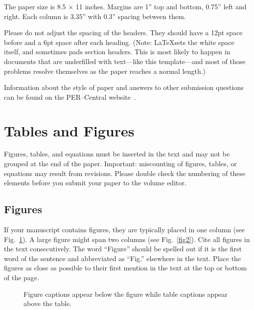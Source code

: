 \documentclass[english,aps,pra,reprint,noshowpacs,superscriptaddress]{revtex4-1}
\begin{document}
The paper size is 8.5 $\times$ 11 inches.  Margins are 1'' top and bottom, 0.75'' left and right.  Each column is 3.35'' with 0.3'' spacing between them.  

Please do not adjust the spacing of the headers.  They should have a 12pt space before and a 6pt space after each heading. (Note: \LaTeX sets the white space itself, and sometimes pads section headers. This is most likely to happen in documents that are underfilled with text---like this template---and most of those problems resolve themselves as the paper reaches a normal length.)

Information about the style of paper and answers to other submission questions can be found on the PER--Central website~\cite{per-cent}. %


\section{Tables and Figures}

Figures, tables, and equations must be inserted in the text and may not be grouped at the end of the paper. Important: miscounting of figures, tables, or equations may result from revisions. Please double check the numbering of these elements before you submit your paper to the volume editor.  %

\subsection{Figures}

If your manuscript contains figures, they are typically placed in one column (see Fig.\ \ref{fig1}).  A large figure might span two columns (see Fig.\ \ref{fig2}).  Cite all figures in the text consecutively. The word ``Figure'' should be spelled out if it is the first word of the sentence and abbreviated as ``Fig.'' elsewhere in the text. Place the figures as close as possible to their first mention in the text at the top or bottom of the page.

\begin{figure}
\caption{Figure captions appear below the figure while table captions appear above the table.\label{fig1}}
\end{figure}
\end{document}
